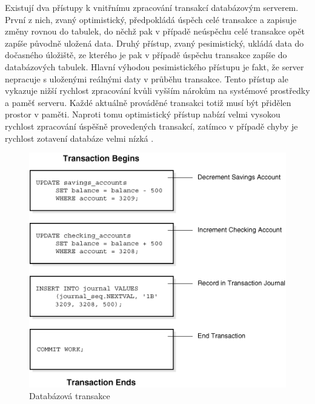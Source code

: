 Existují dva přístupy k vnitřnímu zpracování transakcí databázovým serverem. První z nich, zvaný optimistický, předpokládá úspěch celé transakce a zapisuje změny rovnou do tabulek, do něchž pak v případě neúspěchu celé transakce opět zapíše původně uložená data. Druhý přístup, zvaný pesimistický, ukládá data do dočasného úložiště, ze kterého je pak v případě úspěchu transakce zapíše do databázových tabulek. Hlavní výhodou pesimistického přístupu je fakt, že server nepracuje s uloženými reálnými daty v průběhu transakce. Tento přístup ale vykazuje nižší rychlost zpracování kvůli vyšším nárokům na systémové prostředky a paměť serveru. Každé aktuálně prováděné transakci totiž musí být přidělen prostor v paměti. Naproti tomu optimistický přístup nabízí velmi vysokou rychlost zpracování úspěšně provedených transakcí, zatímco v případě chyby je rychlost zotavení databáze velmi nízká \cite{pesimistic_optimistic}.

\begin{figure}[h]
\begin{centering}
\includegraphics[scale=0.5]{obrazky/sql_transakce}
\par\end{centering}
\caption{Databázová transakce \cite{oracle_transactions} \label{fig:oracleTransactions}}
\end{figure}

\pagebreak
